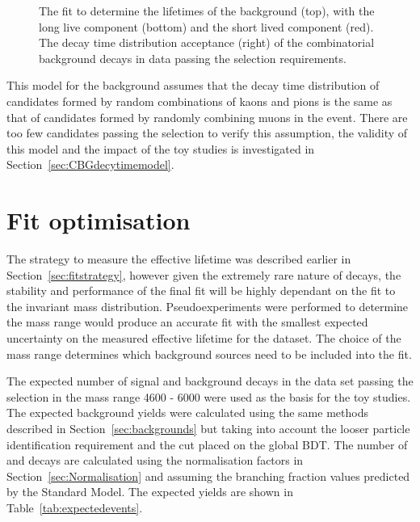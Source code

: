 \begin{figure}[htbp]
\begin{subfigure}[b]{0.48\textwidth}
   \end{subfigure}
    \caption{The \ml fit to determine the lifetimes of the background (top), with the long live component (bottom) and the short lived component (red). The decay time distribution acceptance (right) of the combinatorial background decays in data passing the \bhh selection requirements.}
    \label{fig:CBGaccpt}
\end{figure}

This model for the background assumes that the decay time distribution of \bhh candidates formed by random combinations of kaons and pions is the same as that of \bsmumu candidates formed by randomly combining muons in the event. There are too few candidates passing the \bsmumu selection to verify this assumption, the validity of this model and the impact of the toy studies is investigated in Section~\ref{sec:CBGdecytimemodel}.%


\section{Fit optimisation}
\label{sec:toys}
The strategy to measure the \bsmumu effective lifetime was described earlier in Section~\ref{sec:fitstrategy}, however given the extremely rare nature of \bsmumu decays, the stability and performance of the final fit will be highly dependant on the fit to the invariant mass distribution. Pseudoexperiments were performed to determine the mass range would produce an accurate fit with the smallest expected uncertainty on the measured effective lifetime for the dataset. The choice of the mass range determines which background sources need to be included into the fit.


The expected number of signal and background decays in the data set passing the \bsmumu selection in the mass range 4600 - 6000 \mevcc were used as the basis for the toy studies. The expected background yields were calculated using the same methods described in Section~\ref{sec:backgrounds} but taking into account the looser particle identification requirement and the cut placed on the global BDT. The number of \bsmumu and \bdmumu decays are calculated using the normalisation factors in Section~\ref{sec:Normalisation} and assuming the branching fraction values predicted by the Standard Model. The expected yields are shown in Table~\ref{tab:expectedevents}. 


